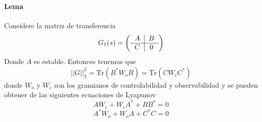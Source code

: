\paragraph{Lema} Considere la matriz de transferencia
\begin{equation*}
    G_1(s) = \left( \begin{tabular}{c|c}$A$&$B$\\\hline$C$&$0$\end{tabular} \right) 
\end{equation*}
Donde $A$ es estable. Entonces tenemos que 
\begin{equation*}
    ||G||_2^2 = \text{Tr}(B^{*} W_o B) = \text{Tr}(C W_c C^{*})
\end{equation*}
donde $W_o$ y $W_c$ son los gramianos de controlabilidad y observabilidad y se pueden obtener de las siguientes ecuaciones de Lyapunov
\begin{equation*}
    A W_c + W_c A^{*} + B B^{*} = 0
\end{equation*}
\begin{equation*}
    A^{*} W_o + W_o A + C^{*} C = 0
\end{equation*}


